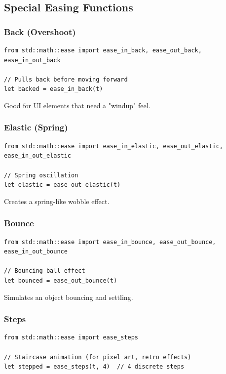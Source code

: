 \subsection{Special Easing Functions}

\subsubsection{Back (Overshoot)}

\begin{lstlisting}
from std::math::ease import ease_in_back, ease_out_back, ease_in_out_back

// Pulls back before moving forward
let backed = ease_in_back(t)
\end{lstlisting}

Good for UI elements that need a "windup" feel.

\subsubsection{Elastic (Spring)}

\begin{lstlisting}
from std::math::ease import ease_in_elastic, ease_out_elastic, ease_in_out_elastic

// Spring oscillation
let elastic = ease_out_elastic(t)
\end{lstlisting}

Creates a spring-like wobble effect.

\subsubsection{Bounce}

\begin{lstlisting}
from std::math::ease import ease_in_bounce, ease_out_bounce, ease_in_out_bounce

// Bouncing ball effect
let bounced = ease_out_bounce(t)
\end{lstlisting}

Simulates an object bouncing and settling.

\subsubsection{Steps}

\begin{lstlisting}
from std::math::ease import ease_steps

// Staircase animation (for pixel art, retro effects)
let stepped = ease_steps(t, 4)  // 4 discrete steps
\end{lstlisting}

